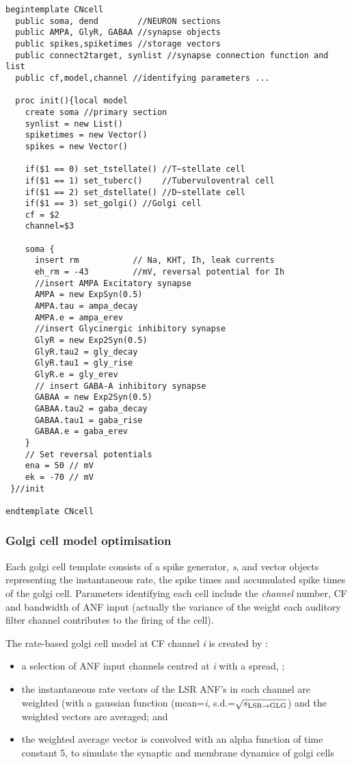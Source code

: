 \begin{lstlisting}[label=lst:CellTemplate,caption=Rothman and Manis cochlear
  nucleus cell template (in CNcell.tem)]
  begintemplate CNcell 
  public soma, dend        //NEURON sections 
  public AMPA, GlyR, GABAA //synapse objects 
  public spikes,spiketimes //storage vectors 
  public connect2target, synlist //synapse connection function and list 
  public cf,model,channel //identifying parameters ...

  proc init(){local model 
    create soma //primary section
    synlist = new List() 
    spiketimes = new Vector() 
    spikes = new Vector()
    
    if($1 == 0) set_tstellate() //T~stellate cell 
    if($1 == 1) set_tuberc()    //Tubervuloventral cell 
    if($1 == 2) set_dstellate() //D~stellate cell 
    if($1 == 3) set_golgi() //Golgi cell 
    cf = $2 
    channel=$3

    soma { 
      insert rm           // Na, KHT, Ih, leak currents 
      eh_rm = -43         //mV, reversal potential for Ih 
      //insert AMPA Excitatory synapse 
      AMPA = new ExpSyn(0.5) 
      AMPA.tau = ampa_decay 
      AMPA.e = ampa_erev 
      //insert Glycinergic inhibitory synapse 
      GlyR = new Exp2Syn(0.5) 
      GlyR.tau2 = gly_decay 
      GlyR.tau1 = gly_rise 
      GlyR.e = gly_erev 
      // insert GABA-A inhibitory synapse 
      GABAA = new Exp2Syn(0.5) 
      GABAA.tau2 = gaba_decay
      GABAA.tau1 = gaba_rise 
      GABAA.e = gaba_erev 
    } 
    // Set reversal potentials
    ena = 50 // mV 
    ek = -70 // mV 
 }//init
 
endtemplate CNcell

\end{lstlisting}



\subsubsection[Golgi model]{Golgi cell model
  optimisation}\label{sec:APDX:golgi-cell-model}

Each golgi cell template consists of a spike generator, \emph{s}, and vector
objects representing the instantaneous rate, the spike times and accumulated
spike times of the golgi cell. Parameters identifying each cell include the
\emph{channel} number, CF and bandwidth of ANF input (actually the variance of
the weight each auditory filter channel contributes to the firing of the cell).

The rate-based golgi cell model at CF channel \emph{i} is created by :
\begin{itemize}
\item a selection of ANF input channels centred at \emph{i} with a spread,
  \sLSRGLG;
\item the instantaneous rate vectors of the LSR ANF's in each channel are
  weighted (with a gaussian function (mean=\emph{i}, s.d.=$\sqrt{\protect s_{\protect\textrm{{LSR}}\to\textrm{{GLG}}}}$) and
  the weighted vectors are averaged; and
\item the weighted average vector is convolved with an alpha function of time
  constant 5, to simulate the synaptic and membrane dynamics of golgi cells
\end{itemize}

